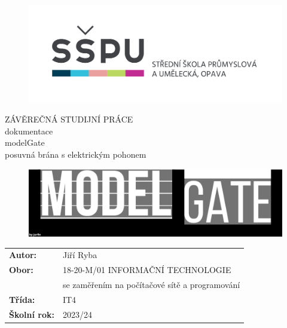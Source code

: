 \documentclass[12pt, a4paper, twoside]{report}
\title{\nazevPrace} %
\author{\jmenoAutora} %
\date{\datumOdevzdani} %
\newcommand\obor{INFORMAČNÍ TECHNOLOGIE} %
\newcommand\kodOboru{18-20-M/01} %
\newcommand\zamereni{se zaměřením na počítačové sítě a programování} %
\newcommand\trida{IT4} %
\newcommand\jmenoAutora{Jiří Ryba}  %
\newcommand\skolniRok{2023/24} %
\newcommand\nazevPrace{modelGate} %
\newcommand\podnazevPrace{posuvná brána s elektrickým pohonem}
\begin{document}
	
	\lstset{basicstyle=\small}
	
	\pagestyle{empty}
	
		
	
	{\selectfont
		\begin{figure}[h]
			\centering
			\includegraphics[width=0.6\linewidth]{image/logo-skoly.png} 
		\end{figure}
		
		{\bfseries %
			\begin{center}
				\vspace{0.025 \textheight}
				\LARGE{ZÁVĚREČNÁ STUDIJNÍ PRÁCE}\\
				\large{dokumentace}\\
				\vspace{0.075 \textheight}
				\LARGE {\nazevPrace}\\
				\large{\podnazevPrace}\\
			\end{center}  
		}%
		
		\vspace{0.05 \textheight}
		
		\begin{figure}[h]
			\centering
			\includegraphics[width=0.6\linewidth]{image/modelGateLogo.png} 
		\end{figure}
		
		\vspace{0.2 \textheight}
		\begin{table}[h!]
			\centering
			\begin{tabular}{ll}
				\textbf{Autor:} & \jmenoAutora\\ 
				\textbf{Obor:} & \kodOboru { } \obor\\
				\textbf{} & \zamereni\\
				\textbf{Třída:} & \trida\\
				\textbf{Školní rok:} & \skolniRok\\
			\end{tabular}
			
		\end{table}	
	}
	
\end{document}
